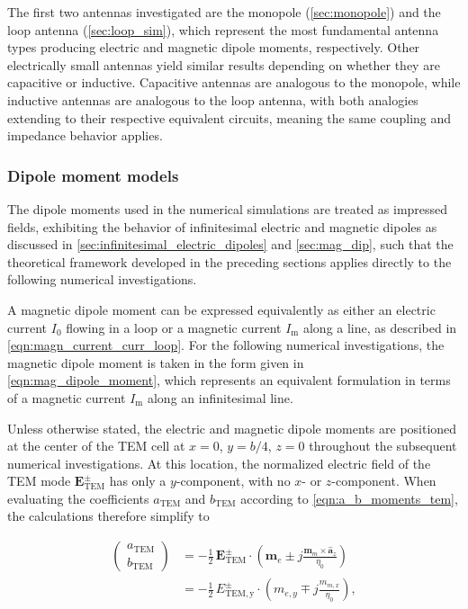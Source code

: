 The first two antennas investigated are the monopole (\cref{sec:monopole}) and the loop antenna (\cref{sec:loop_sim}), which represent the most fundamental antenna types producing electric and magnetic dipole moments, respectively. Other electrically small antennas yield similar results depending on whether they are capacitive or inductive. Capacitive antennas are analogous to the monopole, while inductive antennas are analogous to the loop antenna, with both analogies extending to their respective equivalent circuits, meaning the same coupling and impedance behavior applies.

\subsubsection{Dipole moment models}\label{sec:prep_dip}

The dipole moments used in the numerical simulations are treated as impressed 
fields, exhibiting the behavior of infinitesimal electric and magnetic dipoles 
as discussed in \cref{sec:infinitesimal_electric_dipoles} and \cref{sec:mag_dip}, 
such that the theoretical framework developed in the preceding sections applies 
directly to the following numerical investigations.

A magnetic dipole moment can be expressed equivalently as either an electric current $I_0$ flowing in a loop or a magnetic current $I_\mathrm{m}$ along a line, as described in \eqref{eqn:magn_current_curr_loop}. For the following numerical investigations, the magnetic dipole moment is taken in the form given in \eqref{eqn:mag_dipole_moment}, which represents an equivalent formulation in terms of a magnetic current $I_\mathrm{m}$ along an infinitesimal line. 

Unless otherwise stated, the electric and magnetic dipole moments are 
positioned at the center of the TEM cell at $x=0$, $y=b/4$, $z=0$ 
throughout the subsequent numerical investigations. At this location, the normalized electric field of the TEM mode 
$\mathbf{E}^\pm_\mathrm{TEM}$ has only a $y$-component, with no $x$- or 
$z$-component. When evaluating the coefficients $a_\mathrm{TEM}$ and 
$b_\mathrm{TEM}$ according to \eqref{eqn:a_b_moments_tem}, the 
calculations therefore simplify to \cite{Kreindl_Bauernfeind_Weiss_Stockreiter_Kaltenbacher_2024}

\begin{align}
	\begin{pmatrix}a_\mathrm{TEM} \\ b_\mathrm{TEM}\end{pmatrix} &= 
	-\frac{1}{2}\,\mathbf{E}_\mathrm{TEM}^\pm\cdot
	\left(\mathbf{m}_e 
	\pm j\frac{\mathbf{m}_m\times\hat{\mathbf{a}}_z}{\eta_0}\right)\nonumber\\&=
	-\frac{1}{2}\,{E}_\mathrm{TEM,y}^\pm\cdot
	\left({m}_{e,y} 
	\mp j\frac{{m}_{m,x}}{\eta_0}\right),
\end{align}

